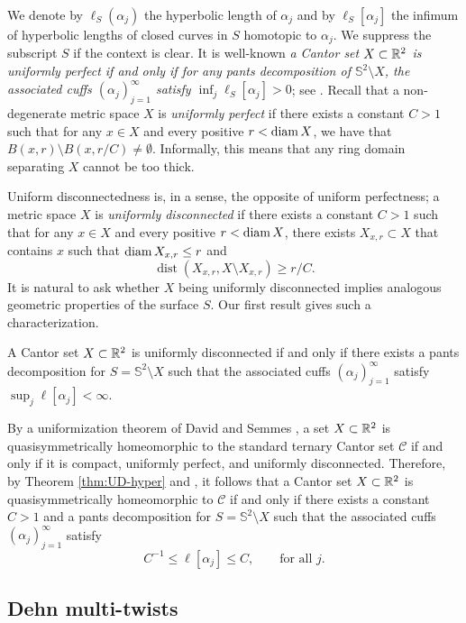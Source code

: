 \documentclass{amsart}
\DeclareMathOperator{\dist}{dist}
\begin{document}
We denote by $\ell_S (\alpha_j)$ the hyperbolic length of $\alpha_j$ and by $\ell_S[\alpha_j]$ the infimum of hyperbolic lengths of closed curves in $S$ homotopic to $\alpha_j$. We suppress the subscript $S$ if the context is clear. It is well-known \emph{a Cantor set $X\subset\mathbb{R}^2$ is uniformly perfect if and only if for any pants decomposition of $\mathbb{S}^2\setminus X$, the associated cuffs $(\alpha_j)_{j=1}^{\infty}$ satisfy $\inf_j \ell_S[ \alpha_j] >0$}; see \cite{Po79}.
Recall that a non-degenerate metric space $X$ is \emph{uniformly perfect} if there exists a constant $C>1$ such that for any $x\in X$ and every positive $r< \operatorname{diam}{X}$, we have that $B(x,r)\setminus B(x,r/C) \neq \emptyset$. Informally, this means that any ring domain separating $X$ cannot be too thick.

Uniform disconnectedness is, in a sense, the opposite of uniform perfectness; a metric space $X$ is \emph{uniformly disconnected} if there exists a constant $C>1$ such that for any $x\in X$ and every positive $r< \operatorname{diam}{X}$, there exists $X_{x,r} \subset X$ that contains $x$ such that $\operatorname{diam}{X_{x,r}}\leq r$ and 
\[ \dist(X_{x,r}, X\setminus X_{x,r})  \geq r/C.\]
It is natural to ask whether $X$ being uniformly disconnected implies analogous geometric properties of the surface $S$. Our first result gives such a characterization.

\begin{theorem}\label{thm:UD-hyper}
A Cantor set $X\subset \mathbb{R}^2$ is uniformly disconnected if and only if there exists a pants decomposition for $S=\mathbb{S}^2\setminus X$ such that the associated cuffs $(\alpha_j)_{j=1}^{\infty}$ satisfy $\sup_j \ell [ \alpha_j ] < \infty$.
\end{theorem}

By a uniformization theorem of David and Semmes \cite{DSbook}, a set $X \subset \mathbb{R}^2$ is quasisymmetrically homeomorphic to the standard ternary Cantor set $\mathcal{C}$ if and only if it is compact, uniformly perfect, and uniformly disconnected. Therefore, by Theorem \ref{thm:UD-hyper} and \cite{Po79}, it follows that a Cantor set $X\subset \mathbb{R}^2$ is quasisymmetrically homeomorphic to $\mathcal{C}$ if and only if there exists a constant $C>1$ and a pants decomposition for $S=\mathbb{S}^2\setminus X$ such that the associated cuffs $(\alpha_j)_{j=1}^{\infty}$ satisfy
\[ C^{-1} \leq \ell [ \alpha_j ] \leq C, \qquad\text{for all $j$}.\]


\subsection{Dehn multi-twists}
\end{document}
